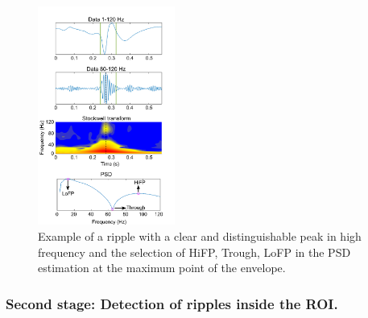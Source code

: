 \begin{figure}[h]
\centering
\includegraphics[width=0.4\textwidth]{Images/fig3-3.jpg}
\caption{Example of a ripple with a clear and distinguishable peak in high frequency and the selection of HiFP, Trough, LoFP in the PSD estimation at the maximum point of the envelope.}
\label{fig:3-3}
\end{figure} 

\subsubsection*{Second stage: Detection of ripples inside the ROI.}

